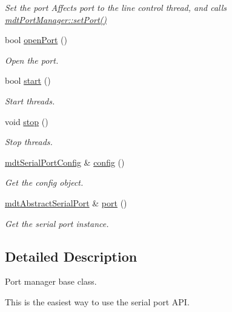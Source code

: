 \begin{DoxyCompactItemize}
\begin{DoxyCompactList}\small\item\em Set the port Affects port to the line control thread, and calls \hyperlink{classmdt_port_manager_afcd156b2d0c9d340999935efb6cd8cb6}{mdtPortManager::setPort()} \end{DoxyCompactList}\item 
bool \hyperlink{classmdt_serial_port_manager_a406481e80014cdd6cb83ff49c3d31685}{openPort} ()
\begin{DoxyCompactList}\small\item\em Open the port. \end{DoxyCompactList}\item 
bool \hyperlink{classmdt_serial_port_manager_a32af7c402d1dbce67c928f8e8274f412}{start} ()
\begin{DoxyCompactList}\small\item\em Start threads. \end{DoxyCompactList}\item 
void \hyperlink{classmdt_serial_port_manager_a819b5aff2ea4d116ebfa3dcb311cf298}{stop} ()
\begin{DoxyCompactList}\small\item\em Stop threads. \end{DoxyCompactList}\item 
\hyperlink{classmdt_serial_port_config}{mdtSerialPortConfig} \& \hyperlink{classmdt_serial_port_manager_a4b8ab7b9d53966a1887d9ce8557b8416}{config} ()
\begin{DoxyCompactList}\small\item\em Get the config object. \end{DoxyCompactList}\item 
\hyperlink{classmdt_abstract_serial_port}{mdtAbstractSerialPort} \& \hyperlink{classmdt_serial_port_manager_aa96937c2123fe4353b948b848d3e064d}{port} ()
\begin{DoxyCompactList}\small\item\em Get the serial port instance. \end{DoxyCompactList}\end{DoxyCompactItemize}


\subsection{Detailed Description}
Port manager base class. 

This is the easiest way to use the serial port API.\par
 

